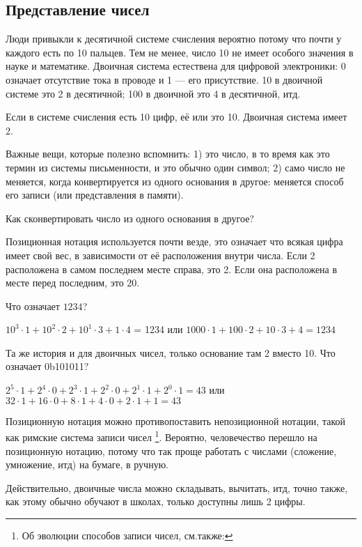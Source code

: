 \subsection{Представление чисел}

Люди привыкли к десятичной системе счисления вероятно потому что почти у каждого есть по 10 пальцев.
Тем не менее, число 10 не имеет особого значения в науке и математике.
Двоичная система естествена для цифровой электроники: 0 означает отсутствие тока в проводе и 1 --- его присутствие.
10 в двоичной системе это 2 в десятичной; 100 в двоичной это 4 в десятичной, итд.

Если в системе счисления есть 10 цифр, её  или  это 10.
Двоичная система имеет  2.

Важные вещи, которые полезно вспомнить:
1)  это число, в то время как  это термин из системы письменности, и это обычно один символ;
2) само число не меняется, когда конвертируется из одного основания в другое: меняется способ его записи (или представления
в памяти).

Как сконвертировать число из одного основания в другое?

Позиционная нотация используется почти везде, это означает что всякая цифра имеет свой вес, в зависимости от её расположения
внутри числа.
Если 2 расположена в самом последнем месте справа, это 2.
Если она расположена в месте перед последним, это 20.

Что означает $1234$?

$10^3 \cdot 1 + 10^2 \cdot 2 + 10^1 \cdot 3 + 1 \cdot 4$ = 1234 или
$1000 \cdot 1 + 100 \cdot 2 + 10 \cdot 3 + 4 = 1234$

Та же история и для двоичных чисел, только основание там 2 вместо 10.
Что означает 0b101011?

$2^5 \cdot 1 + 2^4 \cdot 0 + 2^3 \cdot 1 + 2^2 \cdot 0 + 2^1 \cdot 1 + 2^0 \cdot 1 = 43$ или
$32 \cdot 1 + 16 \cdot 0 + 8 \cdot 1 + 4 \cdot 0 + 2 \cdot 1 + 1 = 43$

Позиционную нотация можно противопоставить непозиционной нотации, такой как римские система записи чисел
\footnote{Об эволюции способов записи чисел, см.также: }.
Вероятно, человечество перешло на позиционную нотацию, потому что так проще работать с числами (сложение, умножение, итд)
на бумаге, в ручную.

Действительно, двоичные числа можно складывать, вычитать, итд, точно также, как этому обычно обучают в школах,
только доступны лишь 2 цифры.

